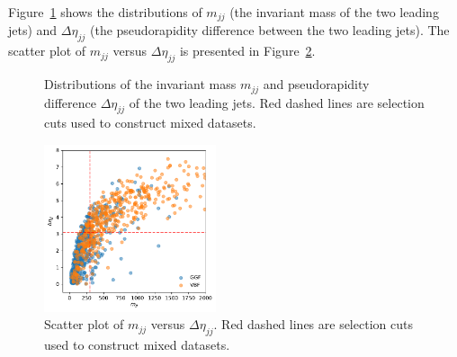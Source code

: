 \documentclass[12pt]{article}
\begin{document}
        Figure~\ref{fig:mjj_deta_distribution} shows the distributions of $m_{jj}$ (the invariant mass of the two leading jets) and $\Delta\eta_{jj}$ (the pseudorapidity difference between the two leading jets). The scatter plot of $m_{jj}$ versus $\Delta\eta_{jj}$ is presented in Figure~\ref{fig:mjj_deta_scatter}.
        \begin{figure}[htpb]
            \centering
            \caption{Distributions of the invariant mass $m_{jj}$ and pseudorapidity difference $\Delta\eta_{jj}$ of the two leading jets. Red dashed lines are selection cuts used to construct mixed datasets.}
            \label{fig:mjj_deta_distribution}
        \end{figure}
        \begin{figure}[htpb]
            \centering
            \includegraphics[width=0.45\textwidth]{mjj_deta_scatter_plot.pdf}
            \caption{Scatter plot of $m_{jj}$ versus $\Delta\eta_{jj}$. Red dashed lines are selection cuts used to construct mixed datasets.}
            \label{fig:mjj_deta_scatter}
        \end{figure}
\end{document}
